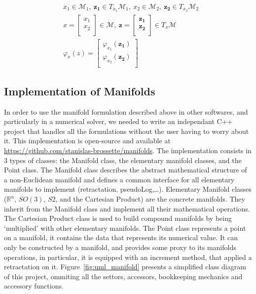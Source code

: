 \begin{align}
  &x_1\in \mathcal{M}_1,\ \mathbf{z_1}\in T_{x_1}\mathcal{M}_1,\ x_2\in \mathcal{M}_2,\ \mathbf{z_2}\in T_{x_2}\mathcal{M}_2\\
  &x=\begin{bmatrix}
    x_1\\x_2\\
  \end{bmatrix}\in \mathcal{M},\ \mathbf{z}=\begin{bmatrix}
    \mathbf{z_1}\\ \mathbf{z_2}\\
  \end{bmatrix}\in T_x\mathcal{M}\\
  &\varphi_x(z) = \begin{bmatrix}
    \varphi_{x_1}(\mathbf{z_1})\\
    \varphi_{x_2}(\mathbf{z_2})\\
  \end{bmatrix}
\end{align}


\subsection{Implementation of Manifolds}
\label{sub:implementation_of_manifolds}

In order to use the manifold formulation described above in other softwares, and particularly in a numerical solver, we needed to write an independant C++ project that handles all the formulations without the user having to worry about it.
This implementation is open-source and available at \href{https://github.com/stanislas-brossette/manifolds}{https://github.com/stanislas-brossette/manifolds}.
The implementation consists in 3 types of classes: the Manifold class, the elementary manifold classes, and the Point class.
The Manifold class describes the abstract mathematical structure of a non-Euclidean manifold and defines a common interface for all elementary manifolds to implement (retractation, pseudoLog,\ldots).
Elementary Manifold classes ($\mathbb{R}^n$, $SO(3)$, $S2$, and the Cartesian Product) are the concrete manifolds.
They inherit from the Manifold class and implement all their mathematical operations.
The Cartesian Product class is used to build compound manifolds by being `multiplied' with other elementary manifolds.
The Point class represents a point on a manifold, it contains the data that represents its numerical value.
It can only be constructed by a manifold, and provides some proxy to its manifolds operations, in particular, it is equipped with an increment method, that applied a retractation on it.
Figure~\ref{fig:uml_manifold} presents a simplified class diagram of this project, ommiting all the settors, accessors, bookkeeping mechanics and accessory functions.

